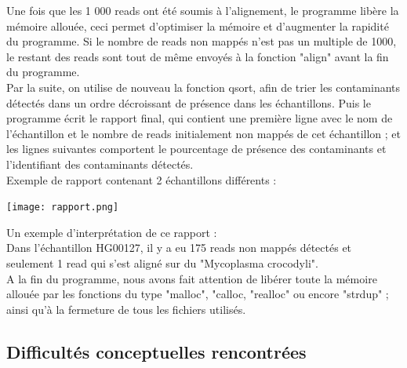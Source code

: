 \documentclass[a4paper,12pt]{article}
\begin{document}
Une fois que les 1 000 reads ont été soumis à l'alignement, le programme libère la mémoire allouée, ceci permet d'optimiser la mémoire et d'augmenter la rapidité du programme. Si le nombre de reads non mappés n'est pas un multiple de 1000, le restant des reads sont tout de même envoyés à la fonction "align" avant la fin du programme. \\


Par la suite, on utilise de nouveau la fonction qsort, afin de trier les contaminants détectés dans un ordre décroissant de présence dans les échantillons. Puis le programme écrit le rapport final, qui contient une première ligne avec le nom de l'échantillon et le nombre de reads initialement non mappés de cet échantillon ; et les lignes suivantes comportent le pourcentage de présence des contaminants et l'identifiant des contaminants détectés.\\

Exemple de rapport contenant 2 échantillons différents :  \begin{center}
 \texttt{[image: rapport.png]}~\\ \end{center}

Un exemple d'interprétation de ce rapport : \\
Dans l'échantillon HG00127, il y a eu 175 reads non mappés détectés et seulement 1 read qui s'est aligné sur du "Mycoplasma crocodyli". \\

A la fin du programme, nous avons fait attention de libérer toute la mémoire allouée par les fonctions du type "malloc", "calloc, "realloc" ou encore "strdup" ; ainsi qu'à la fermeture de tous les fichiers utilisés.


\subsection{Difficultés conceptuelles rencontrées}
\end{document}
